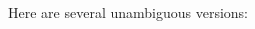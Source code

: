 \documentclass[11pt,fleqn]{article}
\begin{document}
\begin{enumerate}
{\begin{multicols}{2}
\begin{center}
              \end{center}

            \end{multicols}

          }

          \vspace{-7.75mm}

          Here are several unambiguous versions:

          \vspace{-2mm}

          \raggedcolumns

          {

          \setlength{\columnsep}{30mm}

          \begin{multicols}{3}

            \begin{center}

              \begin{grammar}[1.5]
                  \\
                  \\
                  \\
                  \\
                  \\
              \end{grammar}

            \end{center}

          \columnbreak

            \begin{center}

              \begin{grammar}[1.5]
                  \\
                  \\
                  \\
                  \\
                  \\
              \end{grammar}


\end{center}
\end{multicols}}
\end{enumerate}
\end{document}

